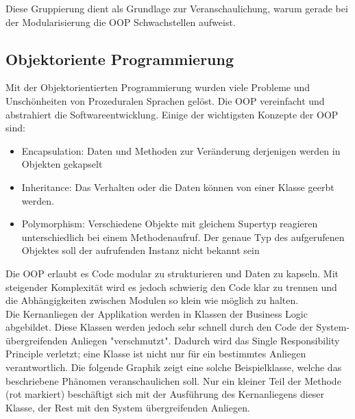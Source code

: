 Diese Gruppierung dient als Grundlage zur Veranschaulichung, warum gerade bei der Modularisierung die OOP Schwachstellen aufweist.\newpage

\subsection{Objektoriente Programmierung}
\label{sec:aop_oop}

Mit der Objektorientierten Programmierung wurden viele Probleme und Unschönheiten von Prozeduralen Sprachen gelöst. Die OOP vereinfacht und abstrahiert die Softwareentwicklung. Einige der wichtigsten Konzepte der OOP sind:

\begin{itemize}
	\item Encapsulation: Daten und Methoden zur Veränderung derjenigen werden in Objekten gekapselt
	\item Inheritance: Das Verhalten oder die Daten können von einer Klasse geerbt werden.
	\item Polymorphism: Verschiedene Objekte mit gleichem Supertyp reagieren unterschiedlich bei einem Methodenaufruf. Der genaue Typ des aufgerufenen Objektes soll der aufrufenden Instanz nicht bekannt sein
\end{itemize}

Die OOP erlaubt es Code modular zu strukturieren und Daten zu kapseln. Mit steigender Komplexität wird es jedoch schwierig den Code klar zu trennen und die Abhängigkeiten zwischen Modulen so klein wie möglich zu halten.\\

Die Kernanliegen der Applikation werden in Klassen der Business Logic abgebildet. Diese Klassen werden jedoch sehr schnell durch den Code der System-übergreifenden Anliegen "verschmutzt". Dadurch wird das Single Responsibility Principle verletzt; eine Klasse ist nicht nur für ein bestimmtes Anliegen verantwortlich. Die folgende Graphik zeigt eine solche Beispielklasse, welche das beschriebene Phänomen veranschaulichen soll. Nur ein kleiner Teil der Methode (rot markiert) beschäftigt sich mit der Ausführung des Kernanliegens dieser Klasse, der Rest mit den System übergreifenden Anliegen.

